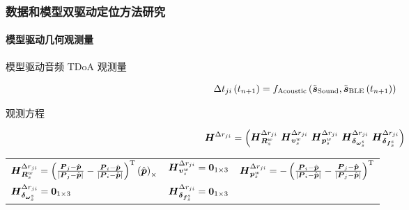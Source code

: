 \begin{frame}

	\frametitle{数据和模型双驱动定位方法研究}	
	\framesubtitle{模型驱动几何观测量}
	
	{\small
		模型驱动音频 TDoA 观测量
		
		\begin{equation*}
			\Delta t_{ji}\left(t_{n+1}\right)
			=
			f_{\mathrm{Acoustic}}\left(\tilde{\vb*{s}}_{\mathrm{Sound}},\tilde{\vb*{s}}_{\mathrm{BLE}}\left(t_{n+1}\right)\right)
		\end{equation*}
				
		观测方程
		
		\begin{equation*}
			\vb*{H}^{\Delta r_{ji}} 
			= 
			\begin{pmatrix}
				\vb*{H}^{\Delta r_{ji}}_{\vb*{R}_s^w}
				~\vb*{H}^{\Delta r_{ji}}_{\vb*{v}_s^w}
				~\vb*{H}^{\Delta r_{ji}}_{\vb*{p}_s^w}
				~\vb*{H}^{\Delta r_{ji}}_{\vb*{\delta}_{\vb*{\omega}_s^s}} 
				~\vb*{H}^{\Delta r_{ji}}_{\vb*{\delta}_{\vb*{f}_s^s}} 
			\end{pmatrix}
		\end{equation*}
		
		\begin{center}
			\begin{tabular*}{\linewidth}{@{\extracolsep{\fill}}lll}
	            $ \vb*{H}^{\Delta r_{ji}} _{\vb*{R}_s^w}
	            =
       			\left(\frac{\vb*{P}_j-\hat{\vb*{p}}}{\left|\vb*{P}_j-\hat{\vb*{p}}\right|} - \frac{\vb*{P}_i-\hat{\vb*{p}}}{\left|\vb*{P}_i-\hat{\vb*{p}}\right|}\right)^{\mathrm{T}} \left(\hat{\vb*{p}}\right)_{\times}  $ 
	            & $ \vb*{H}^{\Delta r_{ji}} _{\vb*{v}_s^w} = \vb*{0}_{1 \times 3} $ 
	            & $ \vb*{H}^{\Delta r_{ji}} _{\vb*{p}_s^w}
       			=
       			-\left(\frac{\vb*{P}_i-\hat{\vb*{p}}}{\left|\vb*{P}_i-\hat{\vb*{p}}\right|}-\frac{\vb*{P}_j-\hat{\vb*{p}}}{\left|\vb*{P}_j-\hat{\vb*{p}}\right|}\right)^{\mathrm{T}} $
	            \\
	            $ \vb*{H}^{\Delta r_{ji}} _{\vb*{\delta}_{\vb*{\omega}_s^s}} = \vb*{0}_{1 \times 3} $ 
	            & $ \vb*{H}^{\Delta r_{ji}}_{\vb*{\delta}_{\vb*{f}_s^s}} = \vb*{0}_{1 \times 3} $ 
	            & 
	   		\end{tabular*}
   		\end{center} 

	}
 
 \end{frame}
 
 
 
